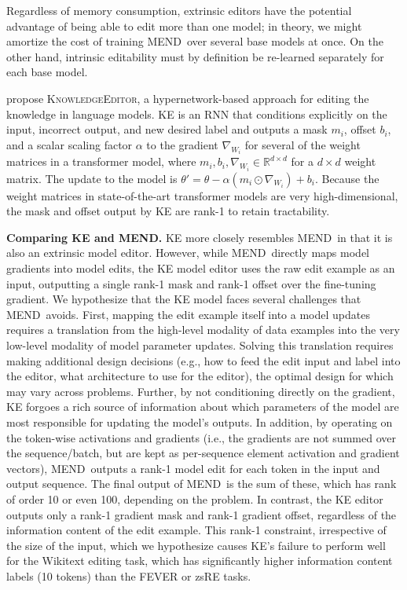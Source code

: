 \documentclass{article}
\makeatletter
\newcommand{\name}{MEND}
\let\origsubsection\subsection
\renewcommand\subsection{\@ifstar{\starsubsection}{\nostarsubsection}}
\newcommand\nostarsubsection[1]
{\subsectionprelude\origsubsection{#1}\subsectionpostlude}
\newcommand\starsubsection[1]
{\subsectionprelude\origsubsection*{#1}\subsectionpostlude}
\newcommand\subsectionprelude{%
  \vspace{-1.5mm}
}
\newcommand\subsectionpostlude{%
  \vspace{-1.5mm}
}
\makeatother
\begin{document}
\begin{appendix}
Regardless of memory consumption, extrinsic editors have the potential advantage of being able to edit more than one model; in theory, we might amortize the cost of training \name~over several base models at once. On the other hand, intrinsic editability must by definition be re-learned separately for each base model.

\subsection{KnowledgeEditor (KE)}
\cite{Cao2021EditingFK} propose \textsc{KnowledgeEditor}, a hypernetwork-based approach for editing the knowledge in language models. KE is an RNN that conditions explicitly on the input, incorrect output, and new desired label and outputs a mask $m_i$, offset $b_i$, and a scalar scaling factor $\alpha$ to the gradient $\nabla_{W_i}$ for several of the weight matrices in a transformer model, where $m_i,b_i,\nabla_{W_i} \in \mathbb{R}^{d \times d}$ for a $d \times d$ weight matrix. The update to the model is $\theta' = \theta - \alpha (m_i \odot \nabla_{W_i}) + b_i$. Because the weight matrices in state-of-the-art transformer models are very high-dimensional, the mask and offset output by KE are rank-1 to retain tractability.

\textbf{Comparing KE and \name\@.} KE more closely resembles \name~in that it is also an extrinsic model editor. However, while \name~directly maps model gradients into model edits, the KE model editor uses the raw edit example as an input, outputting a single rank-1 mask and rank-1 offset over the fine-tuning gradient. We hypothesize that the KE model faces several challenges that \name~avoids. First, mapping the edit example itself into a model updates requires a translation from the high-level modality of data examples into the very low-level modality of model parameter updates. Solving this translation requires making additional design decisions (e.g., how to feed the edit input and label into the editor, what architecture to use for the editor), the optimal design for which may vary across problems. Further, by not conditioning directly on the gradient, KE forgoes a rich source of information about which parameters of the model are most responsible for updating the model's outputs. In addition, by operating on the token-wise activations and gradients (i.e., the gradients are not summed over the sequence/batch, but are kept as per-sequence element activation and gradient vectors), \name~outputs a rank-1 model edit for each token in the input and output sequence. The final output of \name~is the sum of these, which has rank of order 10 or even 100, depending on the problem. In contrast, the KE editor outputs only a rank-1 gradient mask and rank-1 gradient offset, regardless of the information content of the edit example. This rank-1 constraint, irrespective of the size of the input, which we hypothesize causes KE's failure to perform well for the Wikitext editing task, which has significantly higher information content labels (10 tokens) than the FEVER or zsRE tasks.


\end{appendix}
\end{document}
